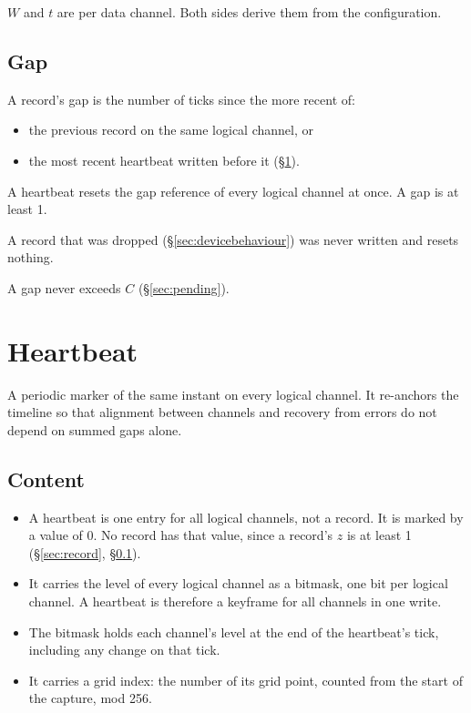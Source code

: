\documentclass[11pt,a4paper]{article}
\newcommand{\sref}[1]{\S\ref{#1}}
\begin{document}
$W$ and $t$ are per data channel. Both sides derive them from the configuration.

\subsection{Gap}\label{sec:gap}

A record's gap is the number of ticks since the more recent of:
\begin{itemize}
  \item the previous record on the same logical channel, or
  \item the most recent heartbeat written before it (\sref{sec:heartbeat}).
\end{itemize}

A heartbeat resets the gap reference of every logical channel at once. A gap is at
least 1.

A record that was dropped (\sref{sec:devicebehaviour}) was never written and resets
nothing.

A gap never exceeds $C$ (\sref{sec:pending}).

\section{Heartbeat}\label{sec:heartbeat}

A periodic marker of the same instant on every logical channel. It re-anchors the
timeline so that alignment between channels and recovery from errors do not depend on
summed gaps alone.

\subsection{Content}\label{sec:hbcontent}

\begin{itemize}
  \item A heartbeat is one entry for all logical channels, not a record. It is marked
        by a value of 0. No record has that value, since a record's $z$ is at least 1
        (\sref{sec:record}, \sref{sec:gap}).
  \item It carries the level of every logical channel as a bitmask, one bit per
        logical channel. A heartbeat is therefore a keyframe for all channels in one
        write.
  \item The bitmask holds each channel's level at the end of the heartbeat's tick,
        including any change on that tick.
  \item It carries a grid index: the number of its grid point, counted from the start
        of the capture, mod 256.
\end{itemize}
\end{document}
